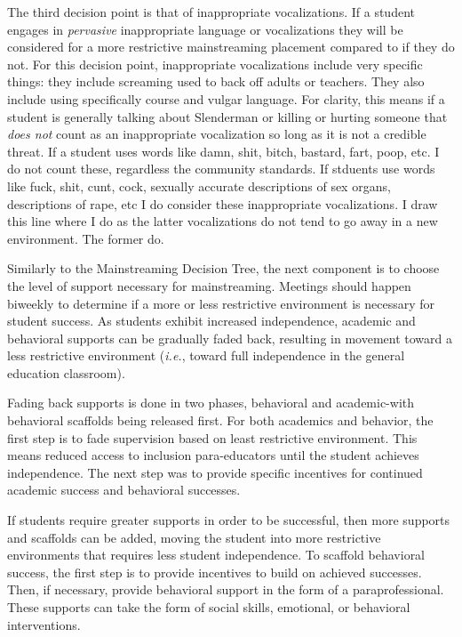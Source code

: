\documentclass[twoside]{article}
\begin{document}
The third decision point is that of inappropriate vocalizations. If a student engages in \textit{pervasive} inappropriate language or vocalizations they  will be considered for a more restrictive mainstreaming placement compared to if they do not. For this decision point, inappropriate vocalizations include very specific things: they include screaming used to back off adults or teachers. They also include using specifically course and vulgar language. For clarity, this means if a student is generally talking about Slenderman or killing or hurting someone that \textit{does not} count as an inappropriate vocalization so long as it is not a credible threat. If a student uses words like damn, shit, bitch, bastard, fart, poop, etc. I do not count these, regardless the community standards. If stduents use words like fuck, shit, cunt, cock, sexually accurate descriptions of sex organs, descriptions of rape, etc I do consider these inappropriate vocalizations. I draw this line where I do as the latter vocalizations do not tend to go away in a new environment. The former do.

Similarly to the Mainstreaming Decision Tree, the next component is to choose the level of support necessary for mainstreaming. Meetings should happen biweekly to determine if a more or less restrictive environment is necessary for student success.  As students exhibit increased independence, academic and behavioral supports can be gradually faded back, resulting in movement toward a less restrictive environment (\textit{i.e.}, toward full independence in the general education classroom). 

Fading back supports is done in two phases, behavioral and academic-with behavioral scaffolds being released first. For both academics and behavior, the first step is to fade supervision based on least restrictive environment. This means reduced access to inclusion para-educators until the student achieves independence. The next step was to provide specific incentives for continued academic success and behavioral successes. 

If students require greater supports in order to be successful, then more supports and scaffolds can be added, moving the student into more restrictive environments that requires less student independence. To scaffold behavioral success, the first step is to provide incentives to build on achieved successes. Then, if necessary, provide behavioral support in the form of a paraprofessional. These supports can take the form of social skills, emotional, or behavioral interventions. 
\end{document}
